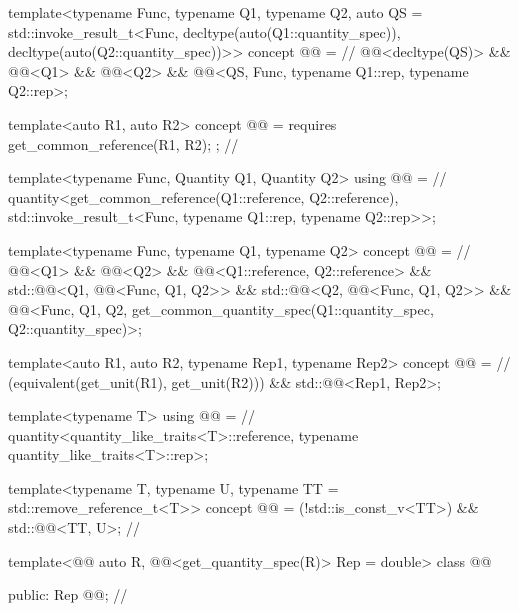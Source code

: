 \begin{codeblock}
{template<typename Func, typename Q1, typename Q2,
         auto QS = std::invoke_result_t<Func, decltype(auto(Q1::quantity_spec)),
                                        decltype(auto(Q2::quantity_spec))>{}>
concept @@ =                                              // \expos
  @@<decltype(QS)> && @@<Q1> && @@<Q2> &&
  @@<QS, Func, typename Q1::rep, typename Q2::rep>;

template<auto R1, auto R2>
concept @@ = requires { get_common_reference(R1, R2); };  // \expos

template<typename Func, Quantity Q1, Quantity Q2>
using @@ =                                                // \expos
  quantity<get_common_reference(Q1::reference, Q2::reference),
           std::invoke_result_t<Func, typename Q1::rep, typename Q2::rep>>;

template<typename Func, typename Q1, typename Q2>
concept @@ =                                      // \expos
  @@<Q1> && @@<Q2> && @@<Q1::reference, Q2::reference> &&
  std::@@<Q1, @@<Func, Q1, Q2>> &&
  std::@@<Q2, @@<Func, Q1, Q2>> &&
  @@<Func, Q1, Q2,
                      get_common_quantity_spec(Q1::quantity_spec, Q2::quantity_spec)>;

template<auto R1, auto R2, typename Rep1, typename Rep2>
concept @@ =                                                      // \expos
  (equivalent(get_unit(R1), get_unit(R2))) && std::@@<Rep1, Rep2>;

template<typename T>
using @@ =                                                 // \expos
  quantity<quantity_like_traits<T>::reference, typename quantity_like_traits<T>::rep>;

template<typename T, typename U, typename TT = std::remove_reference_t<T>>
concept @@ = (!std::is_const_v<TT>) && std::@@<TT, U>;      // \expos

template<@@ auto R, @@<get_quantity_spec(R)> Rep = double>
class @@ {
public:
  Rep @@;  // \expos

}}
\end{codeblock}
